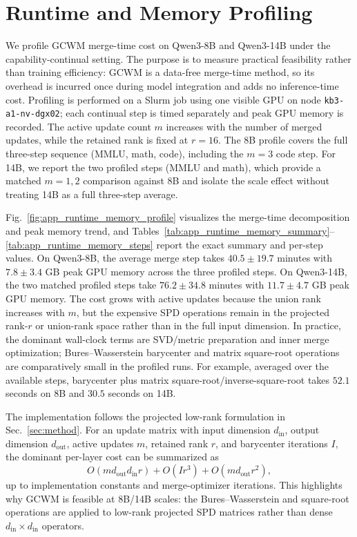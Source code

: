 \documentclass{article}
\begin{document}
\FloatBarrier

\section{Runtime and Memory Profiling}
\label{app:runtime_memory_profile}

We profile GCWM merge-time cost on Qwen3-8B and Qwen3-14B under the capability-continual setting.
The purpose is to measure practical feasibility rather than training efficiency: GCWM is a data-free merge-time method, so its overhead is incurred once during model integration and adds no inference-time cost.
Profiling is performed on a Slurm job using one visible GPU on node \texttt{kb3-a1-nv-dgx02}; each continual step is timed separately and peak GPU memory is recorded.
The active update count \(m\) increases with the number of merged updates, while the retained rank is fixed at \(r=16\). The 8B profile covers the full three-step sequence (MMLU, math, code), including the \(m=3\) code step. For 14B, we report the two profiled steps (MMLU and math), which provide a matched \(m=1,2\) comparison against 8B and isolate the scale effect without treating 14B as a full three-step average.

Fig.~\ref{fig:app_runtime_memory_profile} visualizes the merge-time decomposition and peak memory trend, and Tables~\ref{tab:app_runtime_memory_summary}--\ref{tab:app_runtime_memory_steps} report the exact summary and per-step values.
On Qwen3-8B, the average merge step takes \(40.5\pm19.7\) minutes with \(7.8\pm3.4\) GB peak GPU memory across the three profiled steps.
On Qwen3-14B, the two matched profiled steps take \(76.2\pm34.8\) minutes with \(11.7\pm4.7\) GB peak GPU memory.
The cost grows with active updates because the union rank increases with \(m\), but the expensive SPD operations remain in the projected rank-\(r\) or union-rank space rather than in the full input dimension.
In practice, the dominant wall-clock terms are SVD/metric preparation and inner merge optimization; Bures--Wasserstein barycenter and matrix square-root operations are comparatively small in the profiled runs.
For example, averaged over the available steps, barycenter plus matrix square-root/inverse-square-root takes \(52.1\) seconds on 8B and \(30.5\) seconds on 14B.

The implementation follows the projected low-rank formulation in Sec.~\ref{sec:method}.
For an update matrix with input dimension \(d_{\mathrm{in}}\), output dimension \(d_{\mathrm{out}}\), active updates \(m\), retained rank \(r\), and barycenter iterations \(I\), the dominant per-layer cost can be summarized as
\[
O(m d_{\mathrm{out}} d_{\mathrm{in}} r)
+ O(I r^3)
+ O(m d_{\mathrm{out}} r^2),
\]
up to implementation constants and merge-optimizer iterations.
This highlights why GCWM is feasible at 8B/14B scales: the Bures--Wasserstein and square-root operations are applied to low-rank projected SPD matrices rather than dense \(d_{\mathrm{in}}\times d_{\mathrm{in}}\) operators.
\end{document}
